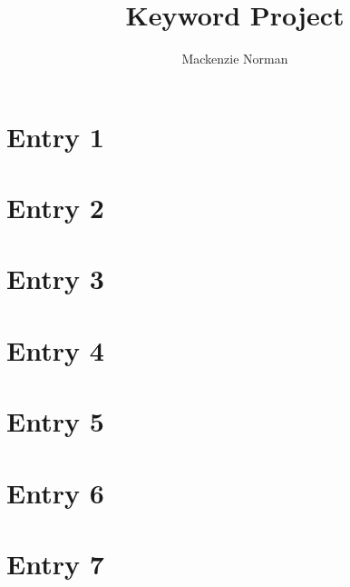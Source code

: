 \documentclass{article}
\title{
Keyword Project
}
\author{Mackenzie Norman}
\date{}
\begin{document}
\maketitle


\section*{Entry 1}


\section*{Entry 2}


\section*{Entry 3}


\section*{Entry 4}

\section*{Entry 5}


\section*{Entry 6}

\section*{Entry 7}

\end{document}

